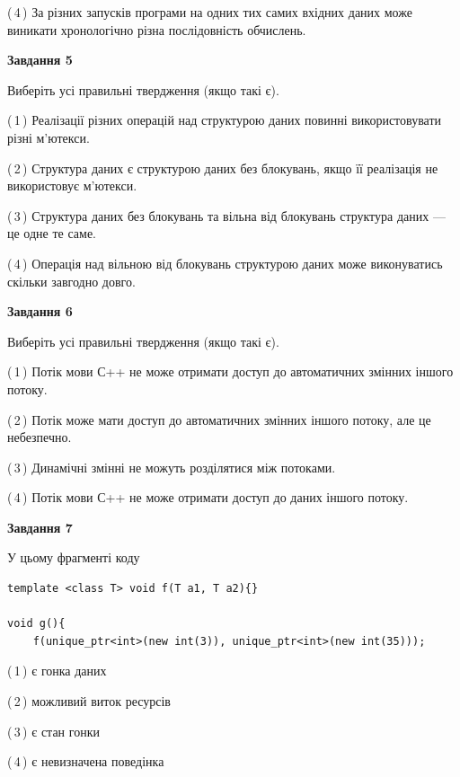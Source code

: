 \documentclass[12pt, ukrainian]{article}
\begin{document}
\begin {large}
{(\,4\,) За різних запусків програми на одних тих самих вхідних даних може виникати хронологічно різна послідовність обчислень.%


\begin{center}
\textbf{Завдання 5}
\end{center}

Виберіть усі правильні твердження (якщо такі є).\par
\vspace{2mm}

(\,1\,) Реалізації різних операцій над структурою даних повинні використовувати різні м’ютекси.%

(\,2\,) Структура даних є структурою даних без блокувань, якщо її реалізація не використовує м’ютекси.%

(\,3\,) Структура даних без блокувань та вільна від блокувань структура даних --- це одне те саме.%

(\,4\,) Операція над вільною від блокувань структурою даних може виконуватись скільки завгодно довго.%
\newpage


\begin{center}
\textbf{Завдання 6}
\end{center}

Виберіть усі правильні твердження (якщо такі є).\par
\vspace{2mm}

(\,1\,) Потік мови С++ не може отримати доступ до автоматичних змінних іншого потоку.%

(\,2\,) Потік може мати доступ до автоматичних змінних іншого потоку, але це небезпечно.%

(\,3\,) Динамічні змінні не можуть розділятися між потоками.%

(\,4\,) Потік мови С++ не може отримати доступ до даних іншого потоку.%


\begin{center}
\textbf{Завдання 7}
\end{center}

У цьому фрагменті коду
\begin{verbatim}
template <class T> void f(T a1, T a2){}

void g(){
    f(unique_ptr<int>(new int(3)), unique_ptr<int>(new int(35)));
\end{verbatim}

(\,1\,) є гонка даних%

(\,2\,) можливий виток ресурсів%

(\,3\,) є стан гонки%

(\,4\,) є невизначена поведінка%

}
\end {large}

\vspace{4mm}
\newpage
\end{document}
